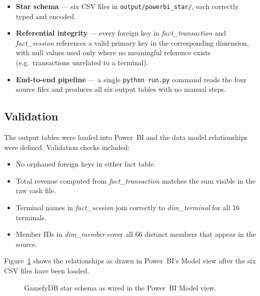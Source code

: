 \begin{itemize}
  \item \textbf{Star schema} — six CSV files in \texttt{output/powerbi\_star/},
        each correctly typed and encoded.
  \item \textbf{Referential integrity} — every foreign key in \textit{fact\_transaction}
        and \textit{fact\_session} references a valid primary key in the corresponding
        dimension, with null values used only where no meaningful reference exists
        (e.g.\ transactions unrelated to a terminal).
  \item \textbf{End-to-end pipeline} — a single \texttt{python run.py} command
        reads the four source files and produces all six output tables with no
        manual steps.
\end{itemize}

\subsection{Validation}

The output tables were loaded into Power~BI and the data model relationships were
defined. Validation checks included:

\begin{itemize}[noitemsep]
  \item No orphaned foreign keys in either fact table.
  \item Total revenue computed from \textit{fact\_transaction} matches the sum
        visible in the raw cash file.
  \item Terminal names in \textit{fact\_session} join correctly to
        \textit{dim\_terminal} for all 16 terminals.
  \item Member IDs in \textit{dim\_member} cover all 66 distinct members that
        appear in the source.
\end{itemize}

Figure~\ref{fig:pbi_model} shows the relationships as drawn in Power~BI's
Model view after the six CSV files have been loaded.

\begin{figure}[H]
  \centering
  \caption{GamefyDB star schema as wired in the Power~BI Model view.}
  \label{fig:pbi_model}
\end{figure}


